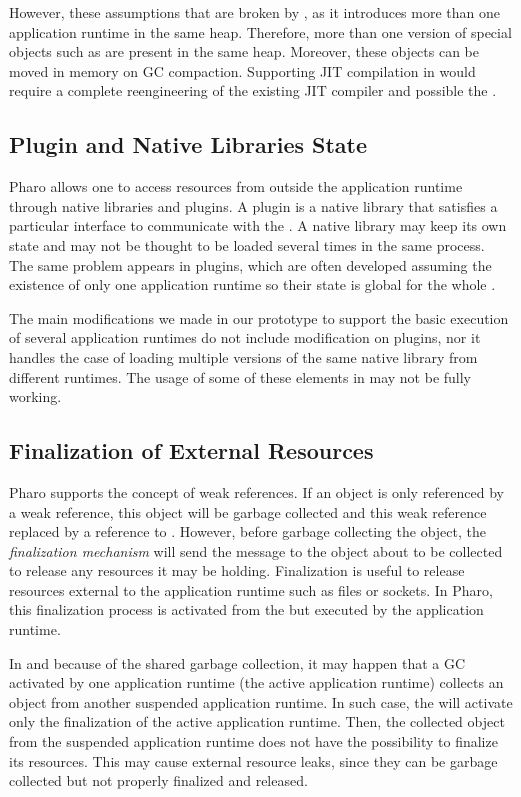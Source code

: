 However, these assumptions that are broken by \Vtt, as it introduces more than one application runtime in the same heap. Therefore, more than one version of special objects such as  are present in the same heap. Moreover, these objects can be moved in memory on GC compaction. Supporting JIT compilation in \Vtt would require a complete reengineering of the existing JIT compiler and possible the \VM.

\subsection{Plugin and Native Libraries State}

Pharo \VM allows one to access resources from outside the application runtime through native libraries and \VM plugins. A \VM plugin is a native library that satisfies a particular interface to communicate with the \VM. A native library may keep its own state and may not be thought to be loaded several times in the same process. The same problem appears in \VM plugins, which are often developed assuming the existence of only one application runtime so their state is global for the whole \VM.

The main \VM modifications we made in our prototype to support the basic execution of several application runtimes do not include modification on \VM plugins, nor it handles the case of loading multiple versions of the same native library from different runtimes. The usage of some of these elements in \Vtt may not be fully working.

\subsection{Finalization of External Resources}

Pharo \VM supports the concept of weak references. If an object is only referenced by a weak reference, this object will be garbage collected and this weak reference replaced by a reference to . However, before garbage collecting the object, the \emph{finalization mechanism} will send the  message to the object about to be collected to release any resources it may be holding. Finalization is useful to release resources external to the application runtime such as files or sockets. In Pharo, this finalization process is activated from the \VM but executed by the application runtime.

In \Vtt and because of the shared garbage collection, it may happen that a GC activated by one application runtime (the active application runtime) collects an object from another suspended application runtime. In such case, the \VM will activate only the finalization of the active application runtime. Then, the collected object from the suspended application runtime does not have the possibility to finalize its resources. This may cause external resource leaks, since they can be garbage collected but not properly finalized and released.

